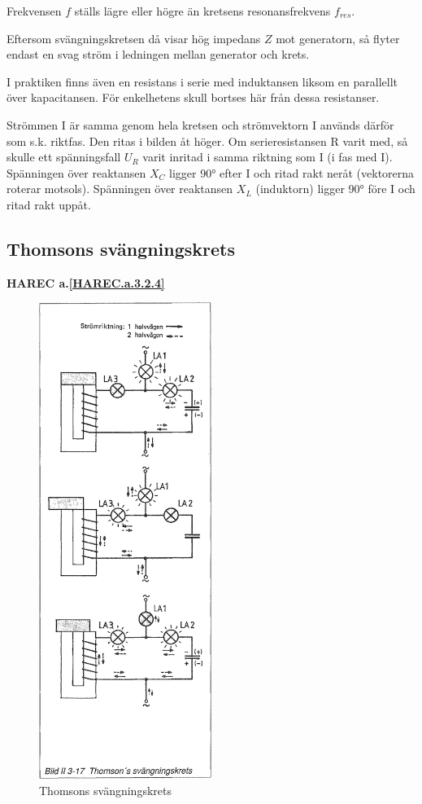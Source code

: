 Frekvensen \(f\) ställs lägre eller högre än kretsens resonansfrekvens
\(f_{res}\).

Eftersom svängningskretsen då visar hög impedans \(Z\) mot generatorn, så
flyter endast en svag ström i ledningen mellan generator och krets.

I praktiken finns även en resistans i serie med induktansen liksom en
parallellt över kapacitansen. För enkelhetens skull bortses här från dessa
resistanser.

Strömmen I är samma genom hela kretsen och strömvektorn I används därför som
s.k. riktfas. Den ritas i bilden åt höger. Om serieresistansen R varit med, så
skulle ett spänningsfall \(U_R\) varit inritad i samma riktning som I
(i fas med I). Spänningen över reaktansen \(X_C\) ligger 90° efter I och ritad
rakt neråt (vektorerna roterar motsols). Spänningen över reaktansen \(X_L\)
(induktorn) ligger 90° före I och ritad rakt uppåt.

\subsection{Thomsons svängningskrets}
\textbf{HAREC a.\ref{HAREC.a.3.2.4}\label{myHAREC.a.3.2.4}}

\begin{figure}
\includegraphics[width=0.5\textwidth]{images/bild_2_3-17}
\caption{Thomsons svängningskrets}
\label{fig:BildII3-17}
\end{figure}

